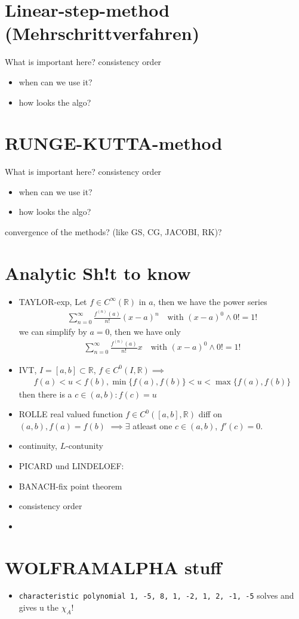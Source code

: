 \documentclass[]{scrartcl}
\newcommand{\R}{\mathbb{R}}
\newcommand{\<}{\trianglelefteq}
\begin{document}
\section*{Linear-step-method (Mehrschrittverfahren)}
What is important here? consistency order
\begin{itemize}
	\item when can we use it?\\
	\item how looks the algo?\\
\end{itemize}

\section*{RUNGE-KUTTA-method}
What is important here? consistency order
\begin{itemize}
	\item when can we use it?\\
	\item how looks the algo?\\
\end{itemize}

convergence of the methods? (like GS, CG, JACOBI, RK)?

\section*{Analytic Sh!t to know}
\begin{itemize}
	\item TAYLOR-exp, Let $f \in C^{\infty}(\R)$ in $a$, then we have the power series
	\begin{align*}
		\sum_{n=0}^{\infty} \frac{f^{(n)}(a)}{n!} (x-a)^n \quad \text{with } (x-a)^0 \wedge 0! = 1!
	\end{align*}
	we can simplify by $a=0$, then we have only
	\begin{align*}
		\sum_{n=0}^{\infty} \frac{f^{(n)}(a)}{n!}x \quad \text{with } (x-a)^0 \wedge 0! = 1!
	\end{align*}
	\item IVT, $I = [a,b] \subset \R$, $f \in C^0(I,\R) \implies$
	\begin{align*}
		f(a) < u < f(b), \min\{f(a), f(b)\} < u <\max\{f(a),f(b)\}
	\end{align*}
	then there is a $c \in (a,b) \colon f(c) = u$
	\item ROLLE real valued function $f \in C^0([a,b],\R)$ diff on $(a,b), f(a) = f(b)$ $\implies \exists$ atleast one $c \in (a,b)$, $f'(c) = 0$.
	\item continuity, $L$-contunity
	\item PICARD und LINDELOEF: 
	
	\item BANACH-fix point theorem
	\item consistency order
	\item 
\end{itemize}

\section*{WOLFRAMALPHA stuff}
\begin{itemize}
	\item \texttt{characteristic polynomial {{1, -5, 8}, {1, -2, 1}, {2, -1, -5}}} solves and gives u the $\chi_A$!
\end{itemize}
\end{document}
